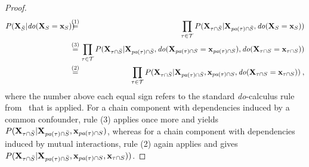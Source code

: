 \documentclass{article}
\newcommand{\vX}{\mathbf{X}}
\newcommand{\vx}{\mathbf{x}}
\newcommand{\dodo}{\mathit{do}}
\newcommand{\lvdo}[1]{\dodo(\vX_{#1} = \vx_{#1})}
\newcommand{\spa}{\mathop{\textit{\scriptsize pa}}}
\newcommand{\chaincomponents}{{\cal T}}
\newcommand{\isequaldo}[1]{\hspace*{-2.5mm} & \overset{(#1)}{=} & \hspace*{-2.5mm}}
\begin{document}
\begin{proof}
\begin{eqnarray*}
	P(\vX_{\bar{S}}|\lvdo{S}) \isequaldo{1} \prod_{\tau \in \chaincomponents} P(\vX_{\tau \cap \bar{S}}|\vX_{\spa(\tau)  \cap \bar{S}},\lvdo{S}) \hfill \\
	\isequaldo{3}  \prod_{\tau \in \chaincomponents} P(\vX_{\tau \cap \bar{S}}|\vX_{\spa(\tau)  \cap \bar{S}},\lvdo{\spa(\tau) \cap S},\lvdo{\tau \cap S}) \\
	\isequaldo{2}  \prod_{\tau \in \chaincomponents} P(\vX_{\tau \cap \bar{S}}|\vX_{\spa(\tau)  \cap \bar{S}},\vx_{\spa(\tau) \cap S},\lvdo{\tau \cap S}) \: ,
\end{eqnarray*}
where the number above each equal sign refers to the standard \textit{do}-calculus rule from~\cite{pearl2012calculus} that is applied. For a chain component with dependencies induced by a common confounder, rule (3) applies once more and yields $P(\vX_{\tau \cap \bar{S}}|\vX_{\spa(\tau)  \cap \bar{S}},\vx_{\spa(\tau) \cap S})$,
whereas for a chain component with dependencies induced by mutual interactions, rule (2) again applies and gives $P(\vX_{\tau \cap \bar{S}}|\vX_{\spa(\tau)  \cap \bar{S}},\vx_{ \spa(\tau) \cap S},\vx_{\tau \cap S}))$.
\end{proof}

%
%
%
%
%
%
\end{document}
